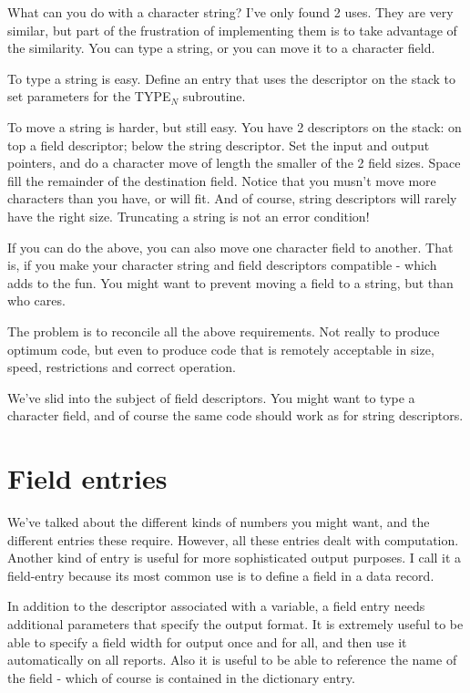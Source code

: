 \documentclass[b5paper, oneside]{book}
\begin{document}
What can you do with a character string? I've only found 2 uses. They are very similar, but part of the frustration of implementing them is to take advantage of the similarity. You can type a string, or you can move it to a character field.

To type a string is easy. Define an entry that uses the descriptor on the stack to set parameters for the TYPE$_N$ subroutine.

To move a string is harder, but still easy. You have 2 descriptors on the stack: on top a field descriptor; below the string descriptor. Set the input and output pointers, and do a character move of length the smaller of the 2 field sizes. Space fill the remainder of the destination field. Notice that you musn't move more characters than you have, or will fit. And of course, string descriptors will rarely have the right size. Truncating a string is not an error condition!

If you can do the above, you can also move one character field to another. That is, if you make your character string and field descriptors compatible - which adds to the fun. You might want to prevent moving a field to a string, but than who cares.

The problem is to reconcile all the above requirements. Not really to produce optimum code, but even to produce code that is remotely acceptable in size, speed, restrictions and correct operation.

We've slid into the subject of field descriptors. You might want to type a character field, and of course the same code should work as for string descriptors.

\section{Field entries}
We've talked about the different kinds of numbers you might want, and the different entries these require. However, all these entries dealt with computation. Another kind of entry is useful for more sophisticated output purposes. I call it a field-entry because its most common use is to define a field in a data record.

In addition to the descriptor associated with a variable, a field entry needs additional parameters that specify the output format. It is extremely useful to be able to specify a field width for output once and for all, and then use it automatically on all reports. Also it is useful to be able to reference the name of the field - which of course is contained in the dictionary entry.
\end{document}

